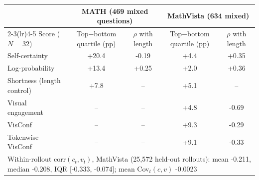 \begin{tabular}{lcccc}
\toprule
& \multicolumn{2}{c}{MATH (469 mixed questions)} & \multicolumn{2}{c}{MathVista (634 mixed)} \\ \cmidrule(lr){2-3}\cmidrule(lr){4-5}
Score ($N=32$) & Top$-$bottom quartile (pp) & $\rho$ with length & Top$-$bottom quartile (pp) & $\rho$ with length \\
\midrule
Self-certainty & +20.4 & -0.19 & +4.4 & +0.35 \\
Log-probability & +13.4 & +0.25 & +2.0 & +0.36 \\
Shortness (length control) & +7.8 & -- & +5.1 & -- \\
Visual engagement & -- & -- & +4.8 & -0.69 \\
VisConf & -- & -- & +9.3 & -0.29 \\
Tokenwise VisConf & -- & -- & +9.1 & -0.33 \\ \midrule
\multicolumn{5}{l}{Within-rollout corr$(c_t, v_t)$, MathVista (25,572 held-out rollouts): mean -0.211, median -0.208, IQR [-0.333, -0.074]; mean Cov$_t(c,v)$ -0.0023} \\
\bottomrule
\end{tabular}